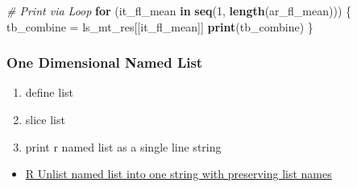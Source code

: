 \documentclass[
]{book}
\newenvironment{Shaded}{\begin{snugshade}}{\end{snugshade}}
\newcommand{\CommentTok}[1]{\textcolor[rgb]{0.56,0.35,0.01}{\textit{#1}}}
\newcommand{\ControlFlowTok}[1]{\textcolor[rgb]{0.13,0.29,0.53}{\textbf{#1}}}
\newcommand{\DecValTok}[1]{\textcolor[rgb]{0.00,0.00,0.81}{#1}}
\newcommand{\KeywordTok}[1]{\textcolor[rgb]{0.13,0.29,0.53}{\textbf{#1}}}
\newcommand{\NormalTok}[1]{#1}
\newcommand{\OperatorTok}[1]{\textcolor[rgb]{0.81,0.36,0.00}{\textbf{#1}}}
\newcommand{\StringTok}[1]{\textcolor[rgb]{0.31,0.60,0.02}{#1}}
\providecommand{\tightlist}{%
  \setlength{\itemsep}{0pt}\setlength{\parskip}{0pt}}
\begin{document}
\begin{Shaded}
\begin{Highlighting}[]
\CommentTok{\# Print via Loop }
\ControlFlowTok{for}\NormalTok{ (it\_fl\_mean }\ControlFlowTok{in} \KeywordTok{seq}\NormalTok{(}\DecValTok{1}\NormalTok{, }\KeywordTok{length}\NormalTok{(ar\_fl\_mean))) \{}
\NormalTok{  tb\_combine =}\StringTok{ }\NormalTok{ls\_mt\_res[[it\_fl\_mean]]}
  \KeywordTok{print}\NormalTok{(tb\_combine)}
\NormalTok{\}}
\end{Highlighting}
\end{Shaded}

\hypertarget{one-dimensional-named-list}{%
\subsubsection{One Dimensional Named List}\label{one-dimensional-named-list}}

\begin{enumerate}
\def\labelenumi{\arabic{enumi}.}
\tightlist
\item
  define list
\item
  slice list
\item
  print r named list as a single line string
\end{enumerate}

\begin{itemize}
\tightlist
\item
  \href{https://stackoverflow.com/a/55622024/8280804}{R Unlist named list into one string with preserving list names}
\end{itemize}

\begin{Shaded}
\end{Shaded}
\end{document}
